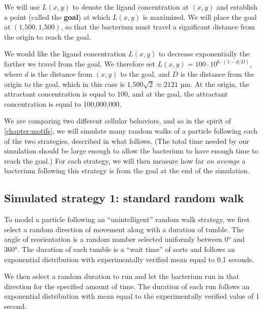We will use $L(x,y)$ to denote the ligand concentration at $(x, y)$ and establish a point (called the \textbf{goal}) at which $L(x,y)$ is maximized. We will place the goal at $(\text{1,500}, \text{1,500})$, so that the bacterium must travel a significant distance from the origin to reach the goal.

We would like the ligand concentration $L(x,y)$ to decrease exponentially the farther we travel from the goal. We therefore set $L(x,y) = 100 \cdot 10^{6 \cdot (1-d/D)}$, where $d$ is the distance from $(x, y)$ to the goal, and $D$ is the distance from the origin to the goal, which in this case is $\text{1,500}\sqrt{2} \approx 2121$ µm. At the origin, the attractant concentration is equal to 100, and at the goal, the attractant concentration is equal to 100,000,000.  \\

\begin{qbox}\end{qbox}

We are comparing two different cellular behaviors, and so in the spirit of \autoref{chapter:motifs}, we will simulate many random walks of a particle following each of the two strategies, described in what follows. (The total time needed by our simulation should be large enough to allow the bacterium to have enough time to reach the goal.) For each strategy, we will then measure how far \textit{on average} a bacterium following this strategy is from the goal at the end of the simulation.

\FloatBarrier
{}
\subsection{Simulated strategy 1: standard random walk}

To model a particle following an ``unintelligent'' random walk strategy, we first select a random direction of movement along with a duration of tumble. The angle of reorientation is a random number selected uniformly between 0° and 360°. The duration of each tumble is a ``wait time'' of sorts and follows an exponential distribution with experimentally verified mean equal to 0.1 seconds.

We then select a random duration to run and let the bacterium run in that direction for the specified amount of time.  The duration of each run follows an exponential distribution with mean equal to the experimentally verified value of 1 second.

